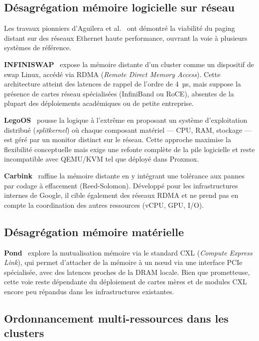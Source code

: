 \subsection{Désagrégation mémoire logicielle sur réseau}

Les travaux pionniers d'Aguilera et al.~\cite{aguilera_2017_remote_memory} ont démontré la viabilité du paging distant sur des réseaux Ethernet haute performance, ouvrant la voie à plusieurs systèmes de référence.

\textbf{INFINISWAP}~\cite{gu_2017_infiniswap} expose la mémoire distante d'un cluster comme un dispositif de swap Linux, accédé via RDMA (\textit{Remote Direct Memory Access}). Cette architecture atteint des latences de rappel de l'ordre de 4~µs, mais suppose la présence de cartes réseau spécialisées (InfiniBand ou RoCE), absentes de la plupart des déploiements académiques ou de petite entreprise.

\textbf{LegoOS}~\cite{shan_2018_legoos} pousse la logique à l'extrême en proposant un système d'exploitation distribué (\textit{splitkernel}) où chaque composant matériel — CPU, RAM, stockage — est géré par un monitor distinct sur le réseau. Cette approche maximise la flexibilité conceptuelle mais exige une refonte complète de la pile logicielle et reste incompatible avec QEMU/KVM tel que déployé dans Proxmox.

\textbf{Carbink}~\cite{zhou_2022_carbink} raffine la mémoire distante en y intégrant une tolérance aux pannes par codage à effacement (Reed-Solomon). Développé pour les infrastructures internes de Google, il cible également des réseaux RDMA et ne prend pas en compte la coordination des autres ressources (vCPU, GPU, I/O).

\subsection{Désagrégation mémoire matérielle}

\textbf{Pond}~\cite{li_2023_pond} explore la mutualisation mémoire via le standard CXL (\textit{Compute Express Link}), qui permet d'attacher de la mémoire à un nœud via une interface PCIe spécialisée, avec des latences proches de la DRAM locale. Bien que prometteuse, cette voie reste dépendante du déploiement de cartes mères et de modules CXL encore peu répandus dans les infrastructures existantes.

\subsection{Ordonnancement multi-ressources dans les clusters}

